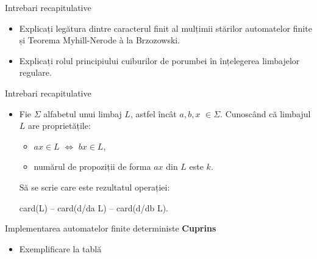 \documentclass[pdf]{beamer}
\begin{document}
\begin{frame}{Intrebari recapitulative}
\begin{itemize}

\item
Explicați legătura dintre caracterul finit al mulțimii stărilor automatelor finite și Teorema Myhill-Nerode à la Brzozowski.
\newline

\item
Explicați rolul principiului cuiburilor de porumbei în înțelegerea limbajelor regulare.
\newline

\end{itemize}
\end{frame}



\begin{frame}{Intrebari recapitulative}
\begin{itemize}
\item
Fie $\Sigma$ alfabetul unui limbaj $L$, astfel încât $a, b, x$ $\in \Sigma$. Cunoscând că limbajul $L$ are proprietățile:

\begin{itemize}
\item
$ax \in L$ $\Leftrightarrow$ $bx \in L$,

\item
numărul de propoziții de forma $ax$ din $L$ este $k$.
\end{itemize}

Să se scrie care este rezultatul operației: 

card(L) – card(d/da L) – card(d/db L).
\newline

\end{itemize}
\end{frame}






\begin{frame}{Implementarea automatelor finite deterministe}
\textbf{Cuprins}
\begin{itemize}
\item
Exemplificare la tablă
\end{itemize}
\end{frame}
\end{document}
